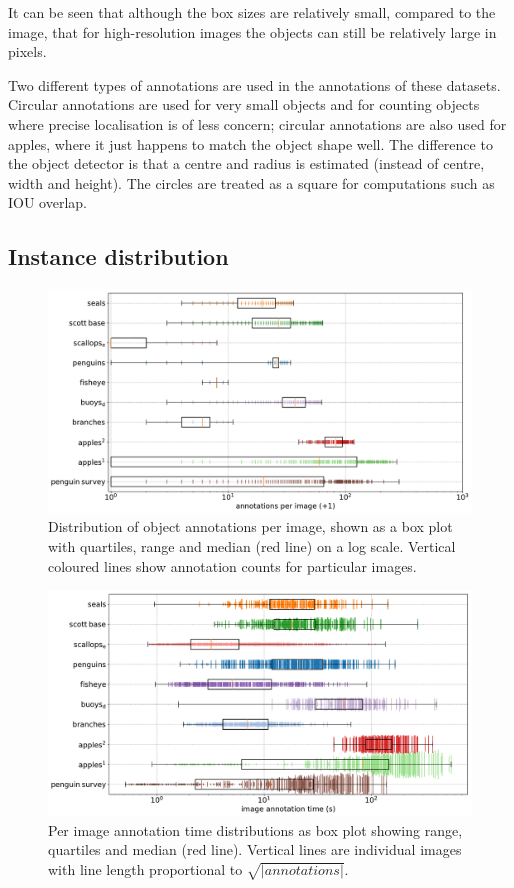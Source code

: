 It can be seen that although the box sizes are relatively small, compared to the image, that for high-resolution images the objects can still be relatively large in pixels.

Two different types of annotations are used in the annotations of these datasets. Circular annotations are used for very small objects and for counting objects where precise localisation is of less concern; circular annotations are also used for apples, where it just happens to match the object shape well. The difference to the object detector is that a centre and radius is estimated (instead of centre, width and height). The circles are treated as a square for computations such as \gls{IOU} overlap.

\subsection {Instance distribution}

\begin{figure}[ht!]
\centering
\includegraphics[width=1.0\linewidth]{charts/summaries/instances_boxplot.pdf}
\caption{ Distribution of object annotations per image, shown as a box plot with quartiles, range and median (red line) on a log scale. Vertical coloured lines show annotation counts for particular images. }
\label{fig:instances_image_plot}
\end{figure}

\begin{figure}[ht]
\centering
\includegraphics[width=1.0\linewidth]{charts/summaries/duration_boxplot.pdf}
\caption{ Per image annotation time distributions as box plot showing range, quartiles and median (red line). Vertical lines are individual images with line length proportional to $\sqrt{|annotations|}$. }
\label{fig:duration_boxplot}
\end{figure}

